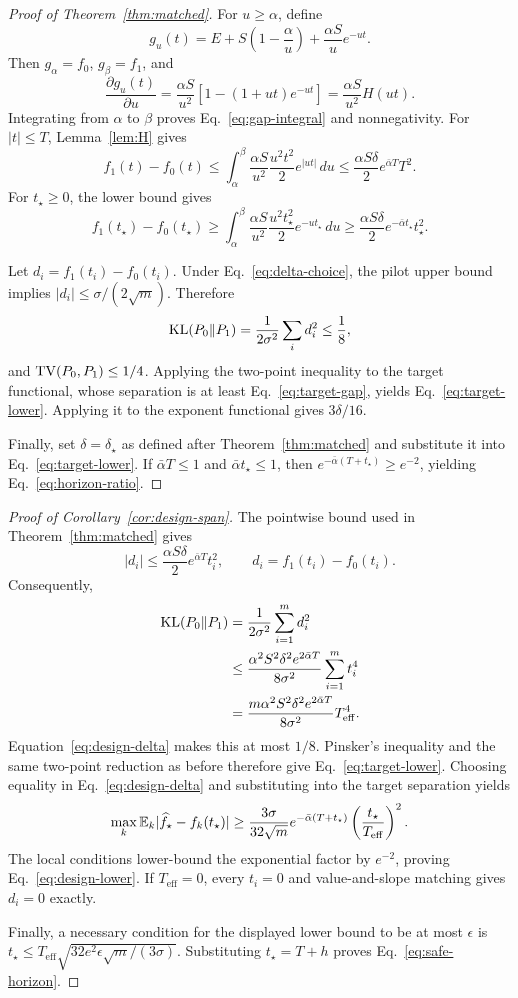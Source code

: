 \begin{proof}[Proof of Theorem~\ref{thm:matched}]
For $u\ge\alpha$, define
\[
 g_u(t)=E+S\left(1-\frac{\alpha}{u}\right)
 +\frac{\alpha S}{u}e^{-ut}.
\]
Then $g_\alpha=f_0$, $g_\beta=f_1$, and
\[
\frac{\partial g_u(t)}{\partial u}
=\frac{\alpha S}{u^2}\left[1-(1+ut)e^{-ut}\right]
=\frac{\alpha S}{u^2}H(ut).
\]
Integrating from $\alpha$ to $\beta$ proves Eq.~\eqref{eq:gap-integral} and nonnegativity. For $|t|\le T$, Lemma~\ref{lem:H} gives
\[
 f_1(t)-f_0(t)
\le\int_\alpha^\beta
 \frac{\alpha S}{u^2}\frac{u^2t^2}{2}e^{|ut|}\,du
\le\frac{\alpha S\delta}{2}e^{\bar\alpha T}T^2.
\]
For $t_\star\ge0$, the lower bound gives
\[
 f_1(t_\star)-f_0(t_\star)
\ge\int_\alpha^\beta
 \frac{\alpha S}{u^2}\frac{u^2t_\star^2}{2}e^{-ut_\star}\,du
\ge\frac{\alpha S\delta}{2}e^{-\bar\alpha t_\star}t_\star^2.
\]

Let $d_i=f_1(t_i)-f_0(t_i)$. Under Eq.~\eqref{eq:delta-choice}, the pilot upper bound implies $|d_i|\le\sigma/(2\sqrt m)$. Therefore
\[
\mathrm{KL}(P_0\|P_1)=\frac{1}{2\sigma^2}\sum_i d_i^2\le\frac18,
\]
and $\mathrm{TV}(P_0,P_1)\le1/4$. Applying the two-point inequality to the target functional, whose separation is at least Eq.~\eqref{eq:target-gap}, yields Eq.~\eqref{eq:target-lower}. Applying it to the exponent functional gives $3\delta/16$.

Finally, set $\delta=\delta_\star$ as defined after Theorem~\ref{thm:matched} and substitute it into Eq.~\eqref{eq:target-lower}. If $\bar\alpha T\le1$ and $\bar\alpha t_\star\le1$, then
$e^{-\bar\alpha(T+t_\star)}\ge e^{-2}$, yielding Eq.~\eqref{eq:horizon-ratio}.
\end{proof}

\begin{proof}[Proof of Corollary~\ref{cor:design-span}]
The pointwise bound used in Theorem~\ref{thm:matched} gives
\[
 |d_i|\le \frac{\alpha S\delta}{2}e^{\bar\alpha T}t_i^2,
 \qquad d_i=f_1(t_i)-f_0(t_i).
\]
Consequently,
\begin{align*}
 \mathrm{KL}(P_0\|P_1)
 &=\frac{1}{2\sigma^2}\sum_{i=1}^m d_i^2\\
 &\le \frac{\alpha^2S^2\delta^2e^{2\bar\alpha T}}
 {8\sigma^2}\sum_{i=1}^m t_i^4\\
 &=\frac{m\alpha^2S^2\delta^2e^{2\bar\alpha T}}
 {8\sigma^2}T_{\mathrm{eff}}^4.
\end{align*}
Equation~\eqref{eq:design-delta} makes this at most $1/8$. Pinsker's inequality and the same two-point reduction as before therefore give Eq.~\eqref{eq:target-lower}. Choosing equality in Eq.~\eqref{eq:design-delta} and substituting into the target separation yields
\[
 \max_k\mathbb{E}_k|\widehat f_\star-f_k(t_\star)|
 \ge \frac{3\sigma}{32\sqrt m}
 e^{-\bar\alpha(T+t_\star)}
 \left(\frac{t_\star}{T_{\mathrm{eff}}}\right)^2.
\]
The local conditions lower-bound the exponential factor by $e^{-2}$, proving Eq.~\eqref{eq:design-lower}. If $T_{\mathrm{eff}}=0$, every $t_i=0$ and value-and-slope matching gives $d_i=0$ exactly.

Finally, a necessary condition for the displayed lower bound to be at most $\epsilon$ is
$t_\star\le T_{\mathrm{eff}}\sqrt{32e^2\epsilon\sqrt m/(3\sigma)}$.
Substituting $t_\star=T+h$ proves Eq.~\eqref{eq:safe-horizon}.
\end{proof}

